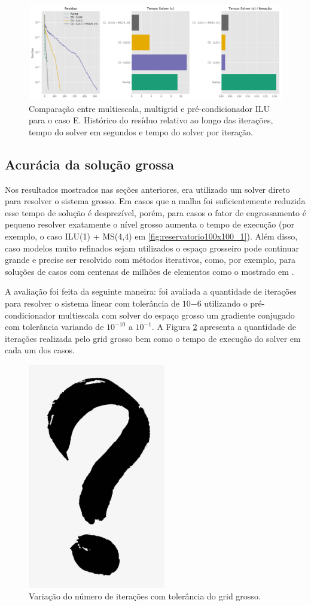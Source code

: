     
\begin{figure}[!htbp]
\centering
\includegraphics[width=\textwidth]{chap08/figs/casoE_2.png}
\caption{Comparação entre multiescala, multigrid e pré-condicionador ILU para o caso E. Histórico do resíduo relativo ao longo das iterações, tempo do solver em segundos e tempo do solver por iteração. }
\label{fig:casoE_2}
\end{figure}


\subsection{Acurácia da solução grossa}

Nos resultados mostrados nas seções anteriores, era utilizado um solver direto para resolver o sistema grosso. Em casos que a malha foi suficientemente reduzida esse tempo de solução é desprezível, porém, para casos o fator de engrossamento é pequeno resolver exatamente o nível grosso aumenta o tempo de execução (por exemplo, o caso ILU(1) + MS(4,4) em \ref{fig:reservatorio100x100_1}). Além disso, caso modelos muito refinados sejam utilizados o espaço grosseiro pode continuar grande e precise ser resolvido com métodos iterativos, como, por exemplo, para soluções de casos com centenas de milhões de elementos como o mostrado em \cite{geomecrio}.

A avaliação foi feita da seguinte maneira: foi avaliada a quantidade de iterações para resolver o sistema linear com tolerância de $10{-6}$ utilizando o pré-condicionador multiescala com solver do espaço grosso um gradiente conjugado com tolerância variando de $10^{-10}$  a $10^{-1}$. A Figura \ref{fig:toleranciaGrossa} apresenta a quantidade de iterações realizada pelo grid grosso bem como o tempo de execução do solver em cada um dos casos. 


\begin{figure}[!htbp]
\caption{ Variação do número de iterações com tolerância do grid grosso. }
\label{fig:toleranciaGrossa}
\centering
\includegraphics[width=6cm]{interrogacao.png}
\end{figure}
